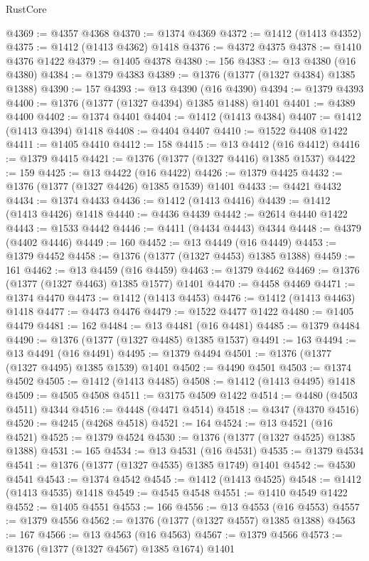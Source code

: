 \begin{lexlean}{RustCore}
\begin{coremodule}
@4369 := @4357 @4368
@4370 := @1374 @4369
@4372 := @1412 (@1413 @4352)
@4375 := @1412 (@1413 @4362) @1418
@4376 := @4372 @4375
@4378 := @1410 @4376 @1422
@4379 := @1405 @4378
@4380 := 156
@4383 := @13 @4380 (@16 @4380)
@4384 := @1379 @4383
@4389 := @1376 (@1377 (@1327 @4384) @1385 @1388)
@4390 := 157
@4393 := @13 @4390 (@16 @4390)
@4394 := @1379 @4393
@4400 := @1376 (@1377 (@1327 @4394) @1385 @1488) @1401
@4401 := @4389 @4400
@4402 := @1374 @4401
@4404 := @1412 (@1413 @4384)
@4407 := @1412 (@1413 @4394) @1418
@4408 := @4404 @4407
@4410 := @1522 @4408 @1422
@4411 := @1405 @4410
@4412 := 158
@4415 := @13 @4412 (@16 @4412)
@4416 := @1379 @4415
@4421 := @1376 (@1377 (@1327 @4416) @1385 @1537)
@4422 := 159
@4425 := @13 @4422 (@16 @4422)
@4426 := @1379 @4425
@4432 := @1376 (@1377 (@1327 @4426) @1385 @1539) @1401
@4433 := @4421 @4432
@4434 := @1374 @4433
@4436 := @1412 (@1413 @4416)
@4439 := @1412 (@1413 @4426) @1418
@4440 := @4436 @4439
@4442 := @2614 @4440 @1422
@4443 := @1533 @4442
@4446 := @4411 (@4434 @4443) @4344
@4448 := @4379 (@4402 @4446)
@4449 := 160
@4452 := @13 @4449 (@16 @4449)
@4453 := @1379 @4452
@4458 := @1376 (@1377 (@1327 @4453) @1385 @1388)
@4459 := 161
@4462 := @13 @4459 (@16 @4459)
@4463 := @1379 @4462
@4469 := @1376 (@1377 (@1327 @4463) @1385 @1577) @1401
@4470 := @4458 @4469
@4471 := @1374 @4470
@4473 := @1412 (@1413 @4453)
@4476 := @1412 (@1413 @4463) @1418
@4477 := @4473 @4476
@4479 := @1522 @4477 @1422
@4480 := @1405 @4479
@4481 := 162
@4484 := @13 @4481 (@16 @4481)
@4485 := @1379 @4484
@4490 := @1376 (@1377 (@1327 @4485) @1385 @1537)
@4491 := 163
@4494 := @13 @4491 (@16 @4491)
@4495 := @1379 @4494
@4501 := @1376 (@1377 (@1327 @4495) @1385 @1539) @1401
@4502 := @4490 @4501
@4503 := @1374 @4502
@4505 := @1412 (@1413 @4485)
@4508 := @1412 (@1413 @4495) @1418
@4509 := @4505 @4508
@4511 := @3175 @4509 @1422
@4514 := @4480 (@4503 @4511) @4344
@4516 := @4448 (@4471 @4514)
@4518 := @4347 (@4370 @4516)
@4520 := @4245 (@4268 @4518)
@4521 := 164
@4524 := @13 @4521 (@16 @4521)
@4525 := @1379 @4524
@4530 := @1376 (@1377 (@1327 @4525) @1385 @1388)
@4531 := 165
@4534 := @13 @4531 (@16 @4531)
@4535 := @1379 @4534
@4541 := @1376 (@1377 (@1327 @4535) @1385 @1749) @1401
@4542 := @4530 @4541
@4543 := @1374 @4542
@4545 := @1412 (@1413 @4525)
@4548 := @1412 (@1413 @4535) @1418
@4549 := @4545 @4548
@4551 := @1410 @4549 @1422
@4552 := @1405 @4551
@4553 := 166
@4556 := @13 @4553 (@16 @4553)
@4557 := @1379 @4556
@4562 := @1376 (@1377 (@1327 @4557) @1385 @1388)
@4563 := 167
@4566 := @13 @4563 (@16 @4563)
@4567 := @1379 @4566
@4573 := @1376 (@1377 (@1327 @4567) @1385 @1674) @1401

\end{coremodule}
\end{lexlean}
